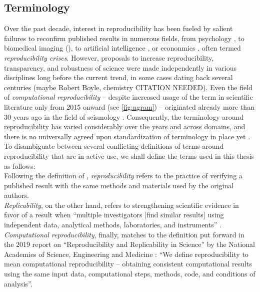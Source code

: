 \subsection{Terminology}

Over the past decade, interest in reproducibility has been fueled by salient failures to reconfirm published results in numerous fields, from psychology \citep{open2015estimating}, to biomedical imaging ()\citep{wagner202310}, to artificial intelligence \citep{hutson2018artificial}, or econonmics \citep{camerer2016evaluating}, often termed \textit{reproducibility crises}.
However, proposals to increase reproducibility, transparency, and robustness of science were made independently in various disciplines long before the current trend, in some cases dating back several centuries (maybe Robert Boyle, chemistry CITATION NEEDED).
Even the field of \textit{computational reproducibility} -- despite increased usage of the term in scientific literature only from 2015 onward (see \cref{fig:ngram}) -- originated already more than 30 years ago in the field of seismology \citep{claerbout1992electronic} \citep{buckheit1995wavelab}.
Consequently, the terminology around reproducibility has varied considerably over the years and across domains, and there is no universally agreed upon standardization of terminology in place yet \citep{barba2018terminologies}.
To disambiguate between several conflicting definitions of terms around reproducibility that are in active use, we shall define the terms used in this thesis as follows: \\
Following the definition of \citet{peng2006}, \textit{reproducibility} refers to the practice of verifying a published result with the same methods and materials used by the original authors. \\
\textit{Replicability}, on the other hand, refers to strengthening scientific evidence in favor of a result when ``multiple investigators [find similar results] using independent data, analytical methods, laboratories, and instruments''  \citep{peng2006}. \\
\textit{Computational reproducibility}, finally, matches to the definition put forward in the 2019 report on ``Reproducibility and Replicability in Science'' by the National Academies of Science, Engineering and Medicine \citep{engineering2019reproducibility}: ``We define reproducibility to mean computational reproducibility – obtaining consistent computational results using the same input data, computational steps, methods, code, and conditions of analysis''.


